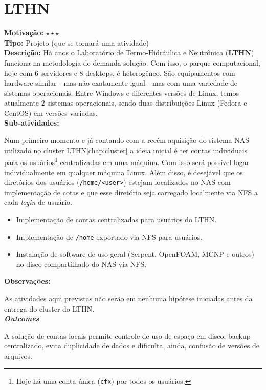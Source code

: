 \chapter{LTHN}

\textbf{Motivação:} $\star\star\star$\\

\textbf{Tipo:} Projeto (que se tornará uma atividade)\\

\textbf{Descrição:} Há anos o Laboratório de Termo-Hidráulica e Neutrônica (\textbf{LTHN}) funciona na metodologia de demanda-solução. Com isso, o parque 
computacional, hoje com 6 servidores e 8 desktops, é heterogêneo. São equipamentos 
com hardware similar - mas não exatamente igual - mas com uma variedade de sistemas 
operacionais. Entre Windows e diferentes versões de Linux, temos atualmente 2 sistemas operacionais, sendo duas distribuições Linux (Fedora e CentOS) em 
versões variadas.\\

\textbf{Sub-atividades:}

Num primeiro momento e já contando com a recém aquisição do sistema NAS utilizado 
no cluster LTHN\ref{chap:cluster} a ideia inicial é ter contas individuais para os 
usuários\footnote{Hoje há uma conta única (\texttt{cfx}) por todos os usuários.} 
centralizadas em uma máquina. Com isso será possível logar individualmente em qualquer máquina Linux. Além disso, é desejável que os diretórios dos usuários 
(\texttt{/home/<user>}) estejam localizados no NAS com implementação de cotas e que 
esse diretório seja carregado localmente via NFS a cada \textit{login} de usuário.

\begin{itemize}
	\item[1] Implementação de contas centralizadas para usuários do LTHN.
	\item[2] Implementação de \texttt{/home} exportado via NFS para usuários.
	\item[3] Instalação de software de uso geral (Serpent, OpenFOAM, MCNP e outros) no disco compartilhado do NAS via NFS.
\end{itemize}

\textbf{Observações:}

As atividades aqui previstas não serão em nenhuma hipótese iniciadas antes da entrega do cluster do LTHN.\\

\textbf{\textit{Outcomes}}

A solução de contas locais permite controle de uso de espaço em disco, backup 
centralizado, evita duplicidade de dados e dificulta, ainda, confusão de versões 
de arquivos.\\

